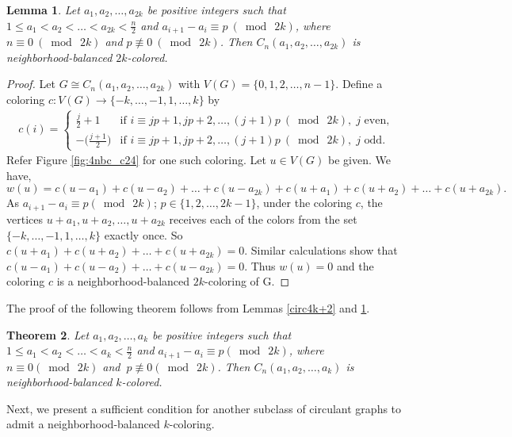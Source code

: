 \documentclass[12pt]{article}
\newtheorem{theorem}{Theorem}[section]
\newtheorem{lemma}[theorem]{Lemma}
\newcommand{\nbc}{neighborhood-balanced $k$-coloring\xspace}
\newcommand{\nbcd}{neighborhood-balanced $k$-colored\xspace}
\begin{document}
\begin{lemma}\label{circ4k}
    Let $a_1,a_2,\dots,a_{2k}$ be positive integers such that $1\leq a_1< a_2 < \dots < a_{2k}<\frac{n}{2}$ and $a_{i+1}-a_{i} \equiv p\ (\bmod\ {2k})$, where $n\equiv 0\ (\bmod\ {2k})$ and $p \not \equiv  0\ (\bmod\ {2k})$.
    Then $C_n(a_1,a_2,\dots,a_{2k})$ is neighborhood-balanced $2k$-colored.
\end{lemma}
\begin{proof}
    Let $G \cong C_n(a_1, a_2, \dots, a_{2k})$ with $V(G)=\{0,1,2,\dots,n-1\}$.
    Define a coloring $c\colon V(G)\rightarrow\{-k, \dots, -1, 1, \dots, k\}$ by 
    \begin{align*}
        c(i)=
        \begin{cases}
           \frac{j}{2}+1 &\text{if } i\equiv jp+1, jp+2, \dots, (j+1)p\ (\bmod\ {2k}),\; j \text{ even,}\\
           - \big(\frac{j+1}{2}\big) &\text{if } i\equiv jp+1, jp+2, \dots, (j+1)p\ (\bmod\ {2k}),\; j \text{ odd.}
        \end{cases}
    \end{align*}
    Refer Figure \ref{fig:4nbc_c24} for one such coloring.
    Let $u\in V(G)$ be given.
    We have, 
    \begin{equation*}
        w(u)=c(u-a_{1}) + c(u-a_{2}) + \dots + c(u-a_{2k}) + c(u+a_{1}) + c(u+a_{2}) + \dots + c(u+a_{2k}).
    \end{equation*}
     As $a_{i+1}-a_{i} \equiv p (\bmod\ {2k})$; $p\in \{1, 2, \dots, 2k-1\}$, under the coloring $c$, the vertices $u+a_1,u+a_2,\dots,u+a_{2k}$ receives each of the colors from the set $\{-k, \dots,-1,1, \dots, k\}$ exactly once.
     So $c(u+a_{1})+c(u+a_{2})+\dots+c(u+a_{2k})=0$.
     Similar calculations show that $c(u-a_{1})+c(u-a_{2})+\dots+c(u-a_{2k})=0$.
     Thus $w(u)=0$ and the coloring $c$ is a neighborhood-balanced $2k$-coloring of G.
\end{proof}

\noindent The proof of the following theorem follows from Lemmas \ref{circ4k+2} and \ref{circ4k}.
\begin{theorem}
    Let $a_1,a_2,\dots,a_k$ be positive integers such that $1\leq a_1 < a_2 < \dots < a_k < \frac{n}{2}$ and $a_{i+1}-a_i \equiv p (\bmod\ {2k})$, where $n\equiv 0 (\bmod\ {2k})$ and $\  p\not\equiv 0 (\bmod\ {2k})$.
    Then $C_n(a_1,a_2,\dots,a_k)$ is \nbcd.
\end{theorem}

Next, we present a sufficient condition for another subclass of circulant graphs to admit a \nbc.
\end{document}
